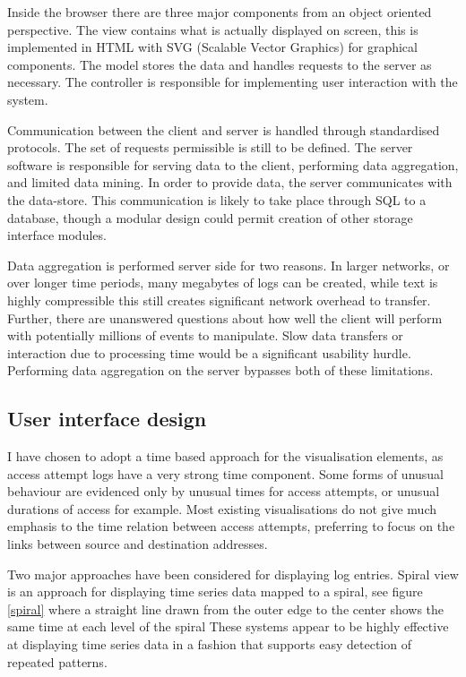 Inside the browser there are three major components from an object oriented perspective. The view contains what is actually displayed on screen, this is implemented in HTML with SVG (Scalable Vector Graphics) for graphical components. The model stores the data and handles requests to the server as necessary. The controller is responsible for implementing user interaction with the system.

Communication between the client and server is handled through standardised protocols. The set of requests permissible is still to be defined. The server software is responsible for serving data to the client, performing data aggregation, and limited data mining. In order to provide data, the server communicates with the data-store. This communication is likely to take place through SQL to a database, though a modular design could permit creation of other storage interface modules.

Data aggregation is performed server side for two reasons. In larger networks, or over longer time periods, many megabytes of logs can be created, while text is highly compressible this still creates significant network overhead to transfer. Further, there are unanswered questions about how well the client will perform with potentially millions of events to manipulate. Slow data transfers or interaction due to processing time would be a significant usability hurdle. Performing data aggregation on the server bypasses both of these limitations. 

\subsection{User interface design}\label{screen_design} 
  
I have chosen to adopt a time based approach for the visualisation elements, as access attempt logs have a very strong time component. Some forms of unusual behaviour are evidenced only by unusual times for access attempts, or unusual durations of access for example. Most existing visualisations do not give much emphasis to the time relation between access attempts, preferring to focus on the links between source and destination addresses.

Two major approaches have been considered for displaying log entries.
Spiral view is an approach for displaying time series data mapped to a spiral, see figure \ref{spiral} where a straight line drawn from the outer edge to the center shows the same time at each level of the spiral \cite{bertini2007spiralview, chin2009visual}
These systems appear to be highly effective at displaying time series data in a fashion that supports easy detection of repeated patterns. 

